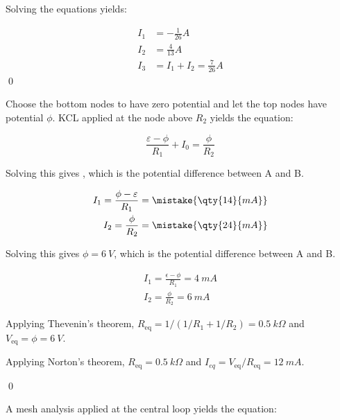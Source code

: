\documentclass[12pt]{article}
\begin{document}
Solving the equations yields:

\begin{equation}
\begin{split}
    I_{1} &= -\frac{1}{26} \unit{A} \\
    I_{2} &= \frac{4}{13} \unit{A} \\
    I_{3} &= I_{1} + I_{2} = \frac{7}{26} \unit{A}
\end{split}
\end{equation}
\qed


Choose the bottom nodes to have zero potential and let the top nodes have potential $\phi$. KCL applied at the node above $R_{2}$ yields the equation:

\begin{equation}
    \frac{\varepsilon - \phi}{R_{1}} + I_{0} = \frac{\phi}{R_{2}}
\end{equation}

Solving this gives , which is the potential difference between A and B.

\begin{equation}
\begin{split}
    I_{1} = \frac{\phi - \varepsilon}{R_{1}} = \mistake{\qty{14}{mA}} \\
    I_{2} = \frac{\phi}{R_{2}} = \mistake{\qty{24}{mA}}
\end{split}
\end{equation}

\begin{correction}
    Solving this gives $\phi = \qty{6}{V}$, which is the potential difference between A and B.
    
    \begin{equation}
    \begin{split}
        I_{1} = \frac{\epsilon - \phi}{R_{1}} = \qty{4}{mA} \\
        I_{2} = \frac{\phi}{R_{2}} = \qty{6}{mA}
    \end{split}
    \end{equation}

    Applying Thevenin's theorem, $R_{\text{eq}} = 1/(1/R_{1} + 1/R_{2}) = \qty{0.5}{k\Omega}$ and $V_{\text{eq}} = \phi = \qty{6}{V}$.

    Applying Norton's theorem, $R_{\text{eq}} = \qty{0.5}{k\Omega}$ and $I_{eq} = V_{\text{eq}}/R_{\text{eq}} = \qty{12}{mA}$.
\end{correction}
\qed

A mesh analysis applied at the central loop yields the equation:
\end{document}
